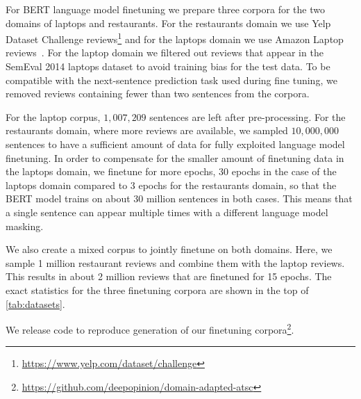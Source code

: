 \documentclass[11pt,a4paper]{article}
\begin{document}
For BERT language model finetuning we prepare three corpora for the
two domains of laptops and restaurants. For the restaurants domain we
use Yelp Dataset Challenge
reviews\footnote{\url{https://www.yelp.com/dataset/challenge}} and
for the laptops domain we use Amazon Laptop reviews~\cite{He2016}. For
the laptop domain we filtered out reviews that appear in the
SemEval 2014 laptops dataset to avoid training bias for the test data.
To be compatible with the next-sentence prediction task used during
fine tuning, we removed reviews containing fewer than two sentences from the corpora.

For the laptop corpus, $1,007,209$ sentences are left after pre-processing.
For the restaurants domain, where more reviews are available, we sampled $10,000,000$
sentences to have a sufficient amount of data for fully exploited language model finetuning.
In order to compensate for the smaller amount of finetuning data in the laptops domain, we finetune for more epochs, 30 epochs in the case of the laptops domain compared to 3 epochs for the restaurants domain, so that the BERT model trains on about 30 million sentences in both cases. This means that a single sentence can appear multiple times with a different language model masking.


We also create a mixed corpus to jointly finetune on both domains. Here, we sample 1 million restaurant reviews and combine them with the laptop reviews. This results in about 2 million reviews that are finetuned for 15 epochs.
The exact statistics for the three finetuning corpora are shown in the top of \autoref{tab:datasets}.

We release code to reproduce generation of our finetuning corpora\footnote{\url{https://github.com/deepopinion/domain-adapted-atsc}}.
\end{document}
